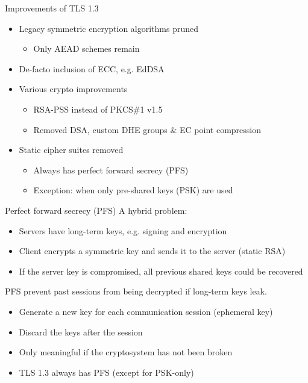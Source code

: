 \begin{frame}{Improvements of TLS 1.3}
  \begin{itemize}[<+(1)->]
    \item Legacy symmetric encryption algorithms pruned
    \begin{itemize}
      \item Only AEAD schemes remain
    \end{itemize}
    \item De-facto inclusion of ECC, e.g. EdDSA
    \item Various crypto improvements
    \begin{itemize}
      \item RSA-PSS instead of PKCS\#1 v1.5
      \item Removed DSA, custom DHE groups \&  EC point compression
    \end{itemize}
    \item Static cipher suites removed
    \begin{itemize}
      \item Always has perfect forward secrecy (PFS)
      \item Exception: when only pre-shared keys (PSK) are used
    \end{itemize}
  \end{itemize}
\end{frame}

\begin{frame}{Perfect forward secrecy (PFS)}
  A hybrid problem:
  \begin{itemize}[<+(1)->]
    \item Servers have long-term keys, e.g. signing and encryption
    \item Client encrypts a symmetric key and sends it to the server (static RSA)
    \item If the server key is compromised, all previous shared keys could be recovered
  \end{itemize}

  \vspace*{1em}

  \pause
  PFS prevent past sessions from being decrypted if long-term keys leak.
  \begin{itemize}[<+(1)->]
    \item Generate a new key for each communication session (ephemeral key)
    \item Discard the keys after the session
    \item Only meaningful if the cryptosystem has not been broken
    \item TLS 1.3 always has PFS (except for PSK-only)
  \end{itemize}
\end{frame}


